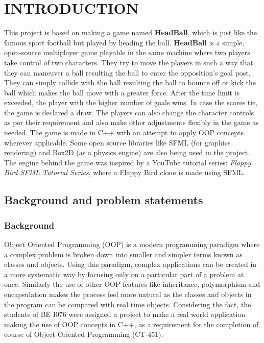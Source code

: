 \documentclass[main]{subfiles}
\begin{document}
\chapter{INTRODUCTION}


This project is based on making a game named \textbf{HeadBall}, which is just like the famous sport football but played by heading the ball. \textbf{HeadBall} is a simple, open-source multiplayer game playable in the same machine where two players take control of two characters. They try to move the players in such a way that they can maneuver a ball resulting the ball to enter the opposition's goal post. They can simply collide with the ball resulting the ball to bounce off or kick the ball which makes the ball move with a greater force. After the time limit is exceeded, the player with the higher number of goals wins. In case the scores tie, the game is declared a draw. The players can also change the character controls as per their requirement and also make other adjustments flexibly in the game as needed. The game is made in C++ with an attempt to apply OOP concepts wherever applicable. Some open source libraries like SFML (for graphics rendering) and Box2D (as a physics engine) are also being used in the project. The engine behind the game was inspired by a YouTube tutorial series: \textit{Flappy Bird SFML Tutorial Series}\cite{sonarsystems_2017_flappy}, where a Flappy Bird clone is made using SFML.

\section{Background and problem statements}
\subsection{Background}
Object Oriented Programming (OOP) is a modern programming paradigm where a complex problem is broken down into smaller and simpler terms known as classes and objects. Using this paradigm, complex applications can be created in a more systematic way by focusing only on a particular part of a problem at once. Similarly the use of other OOP features like inheritance, polymorphism and encapsulation makes the process feel more natural as the classes and objects in the program can be compared with real time objects. Considering the fact, the students of BE I076 were assigned a project to make a real world application making the use of OOP concepts in C++, as a requirement for the completion of course of Object Oriented Programming (CT-451).
\end{document}
